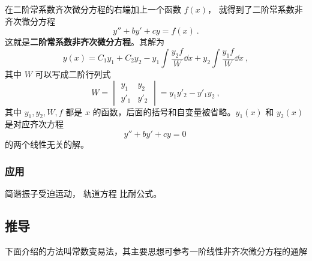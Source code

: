 


在二阶常系数齐次微分方程的右端加上一个函数 $f(x)$， 就得到了二阶常系数非齐次微分方程
\begin{equation}\label{eq_Ode2N_1}
y'' + by' + cy = f(x)~.
\end{equation}
这就是\textbf{二阶常系数非齐次微分方程}。其解为
\begin{equation}
y(x) = C_1 y_1 + C_2 y_2 - y_1\int \frac{y_2 f}{W} \dd{x} + y_2\int \frac{y_1 f}{W} \dd{x}~,
\end{equation}
其中 $W$ 可以写成二阶行列式
\begin{equation}
W = 
\begin{vmatrix}
y_1 & y_2\\
y'_1 & y'_2
\end{vmatrix} = y_1 y'_2 - y'_1 y_2~,
\end{equation}
其中 $y_1, y_2, W, f$ 都是 $x$ 的函数，后面的括号和自变量被省略。$y_1(x)$ 和 $y_2(x)$ 是对应齐次方程 
\begin{equation}\label{eq_Ode2N_4}
y'' + by' + cy = 0~
\end{equation}
的两个线性无关的解。

\subsubsection{应用}
简谐振子受迫运动， 轨道方程 比耐公式。

\subsection{推导}

下面介绍的方法叫常数变易法，其主要思想可参考一阶线性非齐次微分方程的通解%


